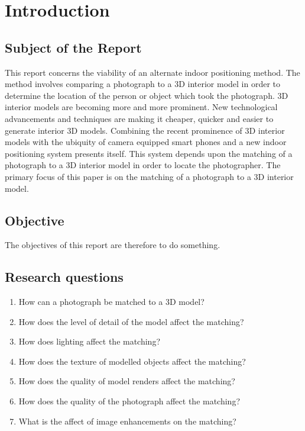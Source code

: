 \documentclass[11pt,a4paper]{report}
\begin{document}
\newpage
\tableofcontents

\newpage
\listoffigures

\setcounter{page}{0}

\newpage
\chapter{Introduction}
	\section{Subject of the Report}
		This report concerns the viability of an alternate indoor positioning method. The method involves comparing a photograph to a 3D interior model in order to determine the location of the person or object which took the photograph. 3D interior models are becoming more and more prominent. New technological advancements and techniques are making it cheaper, quicker and easier to generate interior 3D models. Combining the recent prominence of 3D interior models with the ubiquity of camera equipped smart phones and a new indoor positioning system presents itself. This system depends upon the matching of a photograph to a 3D interior model in order to locate the photographer. The primary focus of this paper is on the matching of a photograph to a 3D interior model.
	
	\section{Objective}
		The objectives of this report are therefore to do something.
		
	\section{Research questions}
		
		\begin{enumerate}
			\item How can a photograph be matched to a 3D model?
			\item How does the level of detail of the model affect the matching?
			\item How does lighting affect the matching?
			\item How does the texture of modelled objects affect the matching?
			\item How does the quality of model renders affect the matching?
			\item How does the quality of the photograph affect the matching?
			\item What is the affect of image enhancements on the matching?
		\end{enumerate}
	
\end{document}
